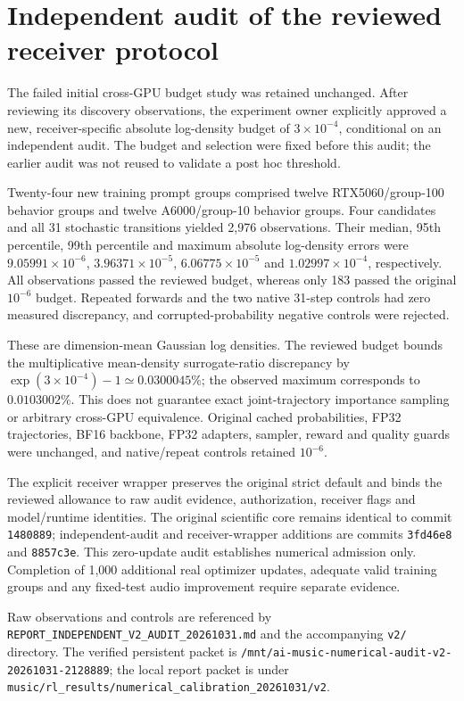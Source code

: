 \section{Independent audit of the reviewed receiver protocol}
\label{sec:reviewed-receiver-v2}
The failed initial cross-GPU budget study was retained unchanged. After reviewing
its discovery observations, the experiment owner explicitly approved a new,
receiver-specific absolute log-density budget of $3\times10^{-4}$, conditional on
an independent audit. The budget and selection were fixed before this audit;
the earlier audit was not reused to validate a post hoc threshold.

Twenty-four new training prompt groups comprised twelve RTX5060/group-100
behavior groups and twelve A6000/group-10 behavior groups. Four candidates and
all 31 stochastic transitions yielded 2,976 observations. Their median, 95th
percentile, 99th percentile and maximum absolute log-density errors were
$9.05991\times10^{-6}$, $3.96371\times10^{-5}$,
$6.06775\times10^{-5}$ and $1.02997\times10^{-4}$, respectively. All observations
passed the reviewed budget, whereas only 183 passed the original $10^{-6}$
budget. Repeated forwards and the two native 31-step controls had zero measured
discrepancy, and corrupted-probability negative controls were rejected.

These are dimension-mean Gaussian log densities. The reviewed budget bounds
the multiplicative mean-density surrogate-ratio discrepancy by
$\exp(3\times10^{-4})-1\simeq0.0300045\%$; the observed maximum corresponds to
$0.0103002\%$. This does not guarantee exact joint-trajectory importance
sampling or arbitrary cross-GPU equivalence. Original cached probabilities,
FP32 trajectories, BF16 backbone, FP32 adapters, sampler, reward and quality
guards were unchanged, and native/repeat controls retained $10^{-6}$.

The explicit receiver wrapper preserves the original strict default and binds
the reviewed allowance to raw audit evidence, authorization, receiver flags and
model/runtime identities. The original scientific core remains identical to
commit \texttt{1480889}; independent-audit and receiver-wrapper additions are
commits \texttt{3fd46e8} and \texttt{8857c3e}. This zero-update audit establishes
numerical admission only. Completion of 1,000 additional real optimizer updates,
adequate valid training groups and any fixed-test audio improvement require
separate evidence.

Raw observations and controls are referenced by
\texttt{REPORT\_INDEPENDENT\_V2\_AUDIT\_20261031.md} and the accompanying
\texttt{v2/} directory. The verified persistent packet is
\texttt{/mnt/ai-music-numerical-audit-v2-20261031-2128889}; the local report packet
is under \texttt{music/rl\_results/numerical\_calibration\_20261031/v2}.
